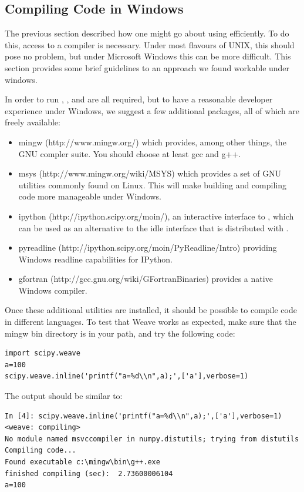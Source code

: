 \documentclass[article]{jss}
\begin{document}
\subsection{Compiling Code in Windows}

The previous section described how one might go about using
 efficiently. To do this, access to a compiler is
necessary. Under most flavours of UNIX, this should pose no problem,
but under Microsoft Windows this can be more difficult. This section
provides some brief guidelines to an approach we found workable under
windows.

In order to run , ,  and  are all required,
but to have a reasonable developer experience under Windows, we suggest
a few additional packages, all of which are freely available:
\begin{itemize}
\item mingw (http://www.mingw.org/) which provides, among other
  things, the GNU compler suite. You should choose at least gcc and
  g++.
\item msys (http://www.mingw.org/wiki/MSYS) which provides a set of
  GNU utilities commonly found on Linux. This will make building and
  compiling code more manageable under Windows.
\item ipython (http://ipython.scipy.org/moin/), an interactive
  interface to , which can be used as an alternative
  to the idle interface that is distributed with .
\item pyreadline (http://ipython.scipy.org/moin/PyReadline/Intro)
  providing Windows readline capabilities for IPython.
\item gfortran (http://gcc.gnu.org/wiki/GFortranBinaries) provides a
  native Windows  compiler.
\end{itemize}
Once these additional utilities are installed, it should be possible
to compile code in different languages. To test that Weave works as
expected, make sure that the mingw bin directory is in your path, and
try the following code:


\begin{lstlisting}[basicstyle={\scriptsize}]
import scipy.weave 
a=100 
scipy.weave.inline('printf("a=%d\\n",a);',['a'],verbose=1)
\end{lstlisting}


The output should be similar to:


\begin{lstlisting}[basicstyle={\scriptsize}]
In [4]: scipy.weave.inline('printf("a=%d\\n",a);',['a'],verbose=1)
<weave: compiling>
No module named msvccompiler in numpy.distutils; trying from distutils
Compiling code...
Found executable c:\mingw\bin\g++.exe
finished compiling (sec):  2.73600006104
a=100
\end{lstlisting}
\end{document}
